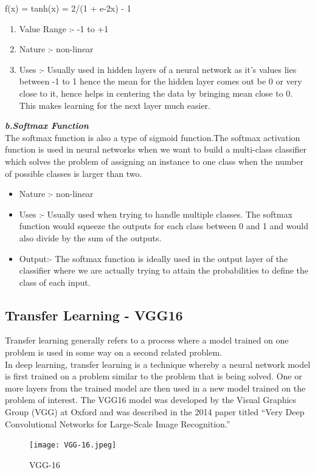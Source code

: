  \begin{center}
    f(x) = tanh(x) = 2/(1 + e-2x) - 1 
 \end{center}
\begin{enumerate}
    \item Value Range :- -1 to +1
    \item Nature :- non-linear
    \item Uses :- Usually used in hidden layers of a neural network as it’s values lies between -1 to 1 hence the mean for the hidden layer comes out be 0 or very close to it, hence helps in centering the data by bringing mean close to 0. This makes learning for the next layer much easier.
    \end{enumerate}
\textbf{\emph{b.Softmax Function }}
\\The softmax function is also a type of sigmoid function.The softmax activation function is used in neural networks when we want to build a multi-class classifier which solves the problem of assigning an instance to one class when the number of possible classes is larger than two.
\begin{itemize}
    \item Nature :- non-linear
    \item Uses :- Usually used when trying to handle multiple classes. The softmax function would squeeze the outputs for each class between 0 and 1 and would also divide by the sum of the outputs.
    \item Output:- The softmax function is ideally used in the output layer of the classifier where we are actually trying to attain the probabilities to define the class of each input.
\end{itemize}
\subsection{Transfer Learning - VGG16}
Transfer learning generally refers to a process where a model trained on one problem is used in some way on a second related problem.\\
In deep learning, transfer learning is a technique whereby a neural network model is first trained on a problem similar to the problem that is being solved. One or more layers from the trained model are then used in a new model trained on the problem of interest.  
The VGG16 model was developed by the Visual Graphics Group (VGG) at Oxford and was described in the 2014 paper titled “Very Deep Convolutional Networks for Large-Scale Image Recognition.”
\begin{figure}[h]
\label{ss}
\centering
\texttt{[image: VGG-16.jpeg]}
\caption{VGG-16}
\end{figure}


